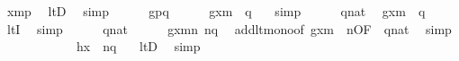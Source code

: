 \begin{isabellebody}
\ {\isachardoublequoteopen}x{\isacharhash}{\kern0pt}{\isacharminus}{\kern0pt}m{\isasymin}p{\isachardoublequoteclose}\ \isamarkupfalse%
\ ltD\ \isamarkupfalse%
\ simp\isanewline
\ \ \ \ \isamarkupfalse%
\ {\isacartoucheopen}g{\isasymin}p{\isasymrightarrow}q{\isacartoucheclose}\isanewline
\ \ \ \ \isamarkupfalse%
\ {\isachardoublequoteopen}g{\isacharbackquote}{\kern0pt}{\isacharparenleft}{\kern0pt}x{\isacharhash}{\kern0pt}{\isacharminus}{\kern0pt}m{\isacharparenright}{\kern0pt}\ {\isasymin}\ q{\isachardoublequoteclose}\ \ \isamarkupfalse%
\ simp\isanewline
\ \ \ \ \isamarkupfalse%
\ {\isacartoucheopen}q{\isasymin}nat{\isacartoucheclose}\ \isamarkupfalse%
\ {\isachardoublequoteopen}g{\isacharbackquote}{\kern0pt}{\isacharparenleft}{\kern0pt}x{\isacharhash}{\kern0pt}{\isacharminus}{\kern0pt}m{\isacharparenright}{\kern0pt}\ {\isacharless}{\kern0pt}\ q{\isachardoublequoteclose}\ \isamarkupfalse%
\ ltI\ \isamarkupfalse%
\ simp\isanewline
\ \ \ \ \isamarkupfalse%
\ {\isacartoucheopen}q{\isasymin}nat{\isacartoucheclose}\isanewline
\ \ \ \ \isamarkupfalse%
\ {\isachardoublequoteopen}{\isacharparenleft}{\kern0pt}g{\isacharbackquote}{\kern0pt}{\isacharparenleft}{\kern0pt}x{\isacharhash}{\kern0pt}{\isacharminus}{\kern0pt}m{\isacharparenright}{\kern0pt}{\isacharparenright}{\kern0pt}{\isacharhash}{\kern0pt}{\isacharplus}{\kern0pt}n\ {\isacharless}{\kern0pt}n{\isacharhash}{\kern0pt}{\isacharplus}{\kern0pt}q{\isachardoublequoteclose}\ \isamarkupfalse%
\ add{\isacharunderscore}{\kern0pt}lt{\isacharunderscore}{\kern0pt}mono{}{\isacharbrackleft}{\kern0pt}of\ {\isachardoublequoteopen}g{\isacharbackquote}{\kern0pt}{\isacharparenleft}{\kern0pt}x{\isacharhash}{\kern0pt}{\isacharminus}{\kern0pt}m{\isacharparenright}{\kern0pt}{\isachardoublequoteclose}\ {\isacharunderscore}{\kern0pt}\ n{\isacharcomma}{\kern0pt}OF\ {\isacharunderscore}{\kern0pt}\ {\isacartoucheopen}q{\isasymin}nat{\isacartoucheclose}{\isacharbrackright}{\kern0pt}\ \isamarkupfalse%
\ simp\isanewline
\ \ \ \ \isamarkupfalse%
\ {}\isanewline
\ \ \ \ \isamarkupfalse%
\ {\isachardoublequoteopen}{\isacharquery}{\kern0pt}h{\isacharbackquote}{\kern0pt}x\ {\isasymin}\ n{\isacharhash}{\kern0pt}{\isacharplus}{\kern0pt}q{\isachardoublequoteclose}\ \ \isamarkupfalse%
\ ltD\ \isamarkupfalse%
\ simp\isanewline
\ \ \isacommand{{\isacharbraceright}{\kern0pt}}\isamarkupfalse%

\end{isabellebody}

